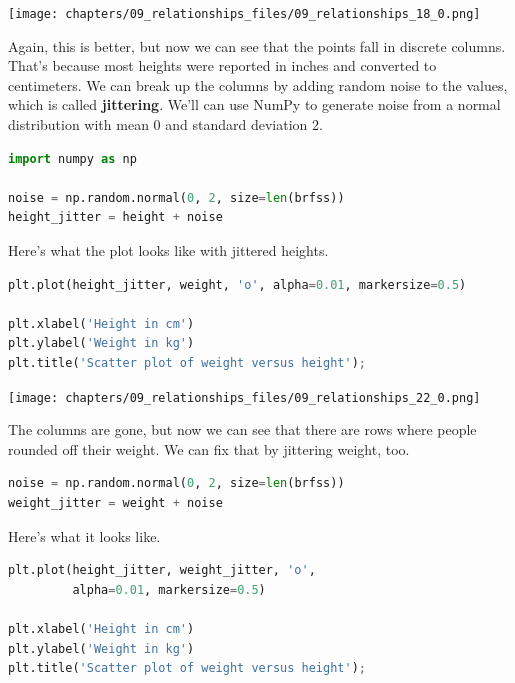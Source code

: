 \begin{center}
\texttt{[image: chapters/09\_relationships\_files/09\_relationships\_18\_0.png]}
\end{center}

Again, this is better, but now we can see that the points fall in
discrete columns. That's because most heights were reported in inches
and converted to centimeters. We can break up the columns by adding
random noise to the values, which is called \textbf{jittering}. We'll
can use NumPy to generate noise from a normal distribution with mean 0
and standard deviation 2.

\begin{lstlisting}[language=Python,style=source]
import numpy as np

noise = np.random.normal(0, 2, size=len(brfss))
height_jitter = height + noise
\end{lstlisting}

Here's what the plot looks like with jittered heights.

\begin{lstlisting}[language=Python,style=source]
plt.plot(height_jitter, weight, 'o', alpha=0.01, markersize=0.5)

plt.xlabel('Height in cm')
plt.ylabel('Weight in kg')
plt.title('Scatter plot of weight versus height');
\end{lstlisting}

\begin{center}
\texttt{[image: chapters/09\_relationships\_files/09\_relationships\_22\_0.png]}
\end{center}

The columns are gone, but now we can see that there are rows where
people rounded off their weight. We can fix that by jittering weight,
too.

\begin{lstlisting}[language=Python,style=source]
noise = np.random.normal(0, 2, size=len(brfss))
weight_jitter = weight + noise
\end{lstlisting}

Here's what it looks like.

\begin{lstlisting}[language=Python,style=source]
plt.plot(height_jitter, weight_jitter, 'o', 
         alpha=0.01, markersize=0.5)

plt.xlabel('Height in cm')
plt.ylabel('Weight in kg')
plt.title('Scatter plot of weight versus height');
\end{lstlisting}

